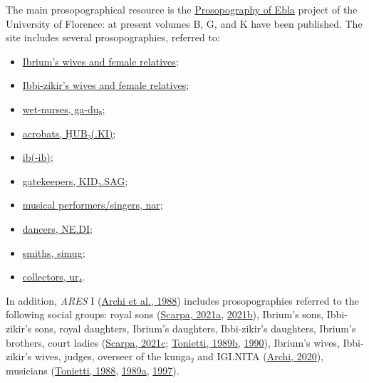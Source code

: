 \documentclass[
]{book}
\providecommand{\tightlist}{%
  \setlength{\itemsep}{0pt}\setlength{\parskip}{0pt}}
\begin{document}
The main prosopographical resource is the \href{https://www.sagas.unifi.it/p359.html}{Prosopography of Ebla} project of the University of Florence: at present volumes B, G, and K have been published. The site includes several prosopographies, referred to:

\begin{itemize}
\tightlist
\item
  \href{https://www.sagas.unifi.it/upload/sub/eblaweb/list_of_pn/dam-and-dumu-mi-ibrium.pdf}{Ibrium's wives and female relatives};
\item
  \href{https://www.sagas.unifi.it/upload/sub/eblaweb/list_of_pn/dam-and-dumu-mi-yibbi-zikir.pdf}{Ibbi-zikir's wives and female relatives};
\item
  \href{https://www.sagas.unifi.it/upload/sub/eblaweb/list_of_pn/ga-du8.pdf}{wet-nurses, ga-du₈};
\item
  \href{https://www.sagas.unifi.it/upload/sub/eblaweb/list_of_pn/hub.pdf}{acrobats, ḪUB₂(.KI)};
\item
  \href{https://www.sagas.unifi.it/upload/sub/eblaweb/ib.pdf}{ib(-ib)};
\item
  \href{https://www.sagas.unifi.it/upload/sub/eblaweb/list_of_pn/kid-sag.pdf}{gatekeepers, KID₂.SAG};
\item
  \href{https://www.sagas.unifi.it/upload/sub/eblaweb/list_of_pn/nar.pdf}{musical performers/singers, nar};
\item
  \href{https://www.sagas.unifi.it/upload/sub/eblaweb/list_of_pn/ne-di.pdf}{dancers, NE.DI};
\item
  \href{https://www.sagas.unifi.it/upload/sub/eblaweb/list_of_pn/simug.pdf}{smiths, simug};
\item
  \href{https://www.sagas.unifi.it/upload/sub/eblaweb/ur4.pdf}{collectors, ur₄}.
\end{itemize}

In addition, \emph{ARES} I (\protect\hyperlink{ref-ArchiEtAl1988}{Archi et al., 1988}) includes prosopographies referred to the following social groups: royal sons (\protect\hyperlink{ref-Scarpa2021b}{Scarpa, 2021a}, \protect\hyperlink{ref-Scarpa2021d}{2021b}), Ibrium's sons, Ibbi-zikir's sons, royal daughters, Ibrium's daughters, Ibbi-zikir's daughters, Ibrium's brothers, court ladies (\protect\hyperlink{ref-Scarpa2021a}{Scarpa, 2021c}; \protect\hyperlink{ref-Tonietti1989a}{Tonietti, 1989b}, \protect\hyperlink{ref-Tonietti1990}{1990}), Ibrium's wives, Ibbi-zikir's wives, judges, overseer of the kunga₂ and IGI.NITA (\protect\hyperlink{ref-Archi2020a}{Archi, 2020}), musicians (\protect\hyperlink{ref-Tonietti1988}{Tonietti, 1988}, \protect\hyperlink{ref-Tonietti1989b}{1989a}, \protect\hyperlink{ref-Tonietti1997a}{1997}).
\end{document}
